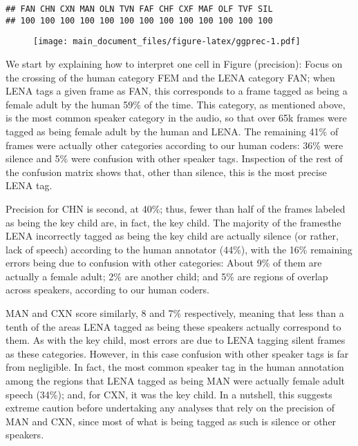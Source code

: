 \documentclass[english,floatsintext,man]{apa6}
\begin{document}
\begin{verbatim}
## FAN CHN CXN MAN OLN TVN FAF CHF CXF MAF OLF TVF SIL 
## 100 100 100 100 100 100 100 100 100 100 100 100 100
\end{verbatim}

\begin{figure}
\centering
\texttt{[image: main\_document\_files/figure-latex/ggprec-1.pdf]}
\caption{}
\end{figure}

We start by explaining how to interpret one cell in Figure (precision):
Focus on the crossing of the human category FEM and the LENA category
FAN; when LENA tags a given frame as FAN, this corresponds to a frame
tagged as being a female adult by the human 59\% of the time. This
category, as mentioned above, is the most common speaker category in the
audio, so that over 65k frames were tagged as being female adult by the
human and LENA. The remaining 41\% of frames were actually other
categories according to our human coders: 36\% were silence and 5\% were
confusion with other speaker tags. Inspection of the rest of the
confusion matrix shows that, other than silence, this is the most
precise LENA tag.

Precision for CHN is second, at 40\%; thus, fewer than half of the
frames labeled as being the key child are, in fact, the key child. The
majority of the framesthe LENA incorrectly tagged as being the key child
are actually silence (or rather, lack of speech) according to the human
annotator (44\%), with the 16\% remaining errors being due to confusion
with other categories: About 9\% of them are actually a female adult;
2\% are another child; and 5\% are regions of overlap across speakers,
according to our human coders.

MAN and CXN score similarly, 8 and 7\% respectively, meaning that less
than a tenth of the areas LENA tagged as being these speakers actually
correspond to them. As with the key child, most errors are due to LENA
tagging silent frames as these categories. However, in this case
confusion with other speaker tags is far from negligible. In fact, the
most common speaker tag in the human annotation among the regions that
LENA tagged as being MAN were actually female adult speech (34\%); and,
for CXN, it was the key child. In a nutshell, this suggests extreme
caution before undertaking any analyses that rely on the precision of
MAN and CXN, since most of what is being tagged as such is silence or
other speakers.
\end{document}
